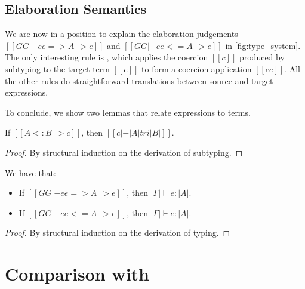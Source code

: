 \subsection{Elaboration Semantics}

\begin{comment}
The subtyping judgement in \cref{fig:subtype_decl} has the form $[[A <: B ~~> c]]$, which says that the subtyping
derivation of $[[A <: B]]$ produces a coercion $[[c]]$ that is used to convert a
term of type $[[ |A| ]]$ to type $[[ |B| ]]$. Each
subtyping rule has its own specific form of coercion.
\end{comment}
We are now in a position to explain the elaboration judgements $[[GG |- ee
=> A ~~> e]]$ and $[[GG |- ee <= A ~~> e]]$ in \cref{fig:type_system}. The only
interesting rule is , which applies the coercion $[[c]]$ produced by
subtyping to the target term $[[e]]$ to form a coercion application
$[[c e]]$. All the other rules do straightforward translations between
source and target expressions.


To conclude, we show two lemmas that relate \namee expressions
to \tname terms.

\begin{lemma}
  If $[[A <: B ~~> c]]$, then $[[c |-  |A| tri |B|]]$.
  \label{lemma:sub-correct}
\end{lemma}
\begin{proof}
  By structural induction on the derivation of subtyping.
\end{proof}


\begin{lemma} We have that:
  \begin{itemize}
  \item If $[[GG |- ee => A ~~> e]]$, then $|\Gamma| \vdash e : |A| $.
  \item If $[[GG |- ee <= A ~~> e]]$, then $|\Gamma| \vdash e : |A| $.
  \end{itemize}
\end{lemma}
\begin{proof}
  By structural induction on the derivation of typing.
\end{proof}

\section{Comparison with \oname}
\label{sec:comparision}

